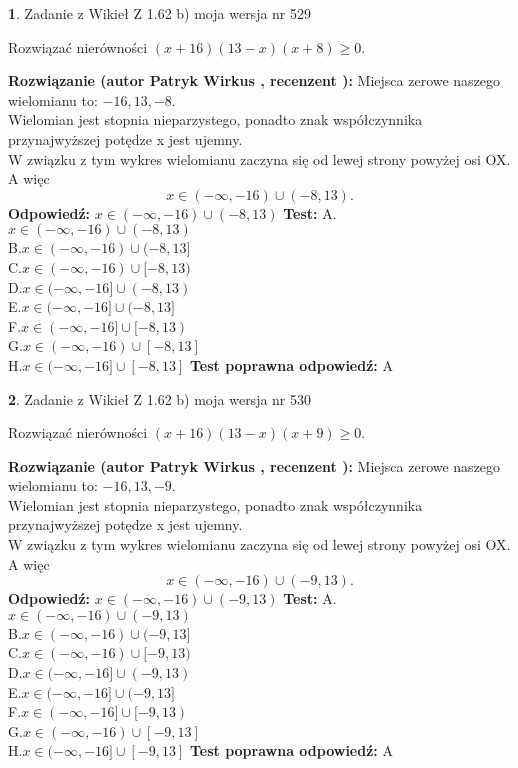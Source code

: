 \documentclass[12pt, a4paper]{article}
\theoremstyle{definition} %
\newtheorem{zad}{}
\newcommand{\zadStart}[1]{\begin{zad}#1\newline}
\newcommand{\zadStop}{\end{zad}}
\newcommand{\rozwStart}[2]{\noindent \textbf{Rozwiązanie (autor #1 , recenzent #2): }\newline}
\newcommand{\rozwStop}{\newline}
\newcommand{\odpStart}{\noindent \textbf{Odpowiedź:}\newline}
\newcommand{\odpStop}{\newline}
\newcommand{\testStart}{\noindent \textbf{Test:}\newline}
\newcommand{\testStop}{\newline}
\newcommand{\kluczStart}{\noindent \textbf{Test poprawna odpowiedź:}\newline}
\newcommand{\kluczStop}{\newline}
\begin{document}
\zadStart{Zadanie z Wikieł Z 1.62 b) moja wersja nr 529}

Rozwiązać nierówności $(x+16)(13-x)(x+8)\ge0$.
\zadStop
\rozwStart{Patryk Wirkus}{}
Miejsca zerowe naszego wielomianu to: $-16, 13, -8$.\\
Wielomian jest stopnia nieparzystego, ponadto znak współczynnika przy\linebreak najwyższej potędze x jest ujemny.\\ W związku z tym wykres wielomianu zaczyna się od lewej strony powyżej osi OX. A więc $$x \in (-\infty,-16) \cup (-8,13).$$
\rozwStop
\odpStart
$x \in (-\infty,-16) \cup (-8,13)$
\odpStop
\testStart
A.$x \in (-\infty,-16) \cup (-8,13)$\\
B.$x \in (-\infty,-16) \cup (-8,13]$\\
C.$x \in (-\infty,-16) \cup [-8,13)$\\
D.$x \in (-\infty,-16] \cup (-8,13)$\\
E.$x \in (-\infty,-16] \cup (-8,13]$\\
F.$x \in (-\infty,-16] \cup [-8,13)$\\
G.$x \in (-\infty,-16) \cup [-8,13]$\\
H.$x \in (-\infty,-16] \cup [-8,13]$
\testStop
\kluczStart
A
\kluczStop



\zadStart{Zadanie z Wikieł Z 1.62 b) moja wersja nr 530}

Rozwiązać nierówności $(x+16)(13-x)(x+9)\ge0$.
\zadStop
\rozwStart{Patryk Wirkus}{}
Miejsca zerowe naszego wielomianu to: $-16, 13, -9$.\\
Wielomian jest stopnia nieparzystego, ponadto znak współczynnika przy\linebreak najwyższej potędze x jest ujemny.\\ W związku z tym wykres wielomianu zaczyna się od lewej strony powyżej osi OX. A więc $$x \in (-\infty,-16) \cup (-9,13).$$
\rozwStop
\odpStart
$x \in (-\infty,-16) \cup (-9,13)$
\odpStop
\testStart
A.$x \in (-\infty,-16) \cup (-9,13)$\\
B.$x \in (-\infty,-16) \cup (-9,13]$\\
C.$x \in (-\infty,-16) \cup [-9,13)$\\
D.$x \in (-\infty,-16] \cup (-9,13)$\\
E.$x \in (-\infty,-16] \cup (-9,13]$\\
F.$x \in (-\infty,-16] \cup [-9,13)$\\
G.$x \in (-\infty,-16) \cup [-9,13]$\\
H.$x \in (-\infty,-16] \cup [-9,13]$
\testStop
\kluczStart
A
\kluczStop
\end{document}
